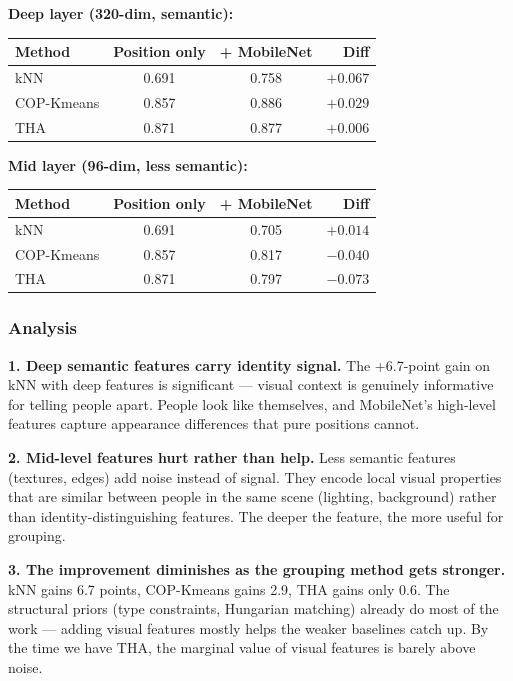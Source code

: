 \textbf{Deep layer (320-dim, semantic):}

\begin{tabular}{lccr}
\hline
\textbf{Method} & \textbf{Position only} & \textbf{+ MobileNet} & \textbf{Diff} \\
\hline
kNN & 0.691 & 0.758 & $+0.067$ \\
COP-Kmeans & 0.857 & 0.886 & $+0.029$ \\
THA & 0.871 & 0.877 & $+0.006$ \\
\hline
\end{tabular}

\vspace{0.5em}

\textbf{Mid layer (96-dim, less semantic):}

\begin{tabular}{lccr}
\hline
\textbf{Method} & \textbf{Position only} & \textbf{+ MobileNet} & \textbf{Diff} \\
\hline
kNN & 0.691 & 0.705 & $+0.014$ \\
COP-Kmeans & 0.857 & 0.817 & $-0.040$ \\
THA & 0.871 & 0.797 & $-0.073$ \\
\hline
\end{tabular}

\subsubsection{Analysis}

\textbf{1. Deep semantic features carry identity signal.} The +6.7-point gain on kNN with deep features is significant --- visual context is genuinely informative for telling people apart. People look like themselves, and MobileNet's high-level features capture appearance differences that pure positions cannot.

\textbf{2. Mid-level features hurt rather than help.} Less semantic features (textures, edges) add noise instead of signal. They encode local visual properties that are similar between people in the same scene (lighting, background) rather than identity-distinguishing features. The deeper the feature, the more useful for grouping.

\textbf{3. The improvement diminishes as the grouping method gets stronger.} kNN gains 6.7 points, COP-Kmeans gains 2.9, THA gains only 0.6. The structural priors (type constraints, Hungarian matching) already do most of the work --- adding visual features mostly helps the weaker baselines catch up. By the time we have THA, the marginal value of visual features is barely above noise.

